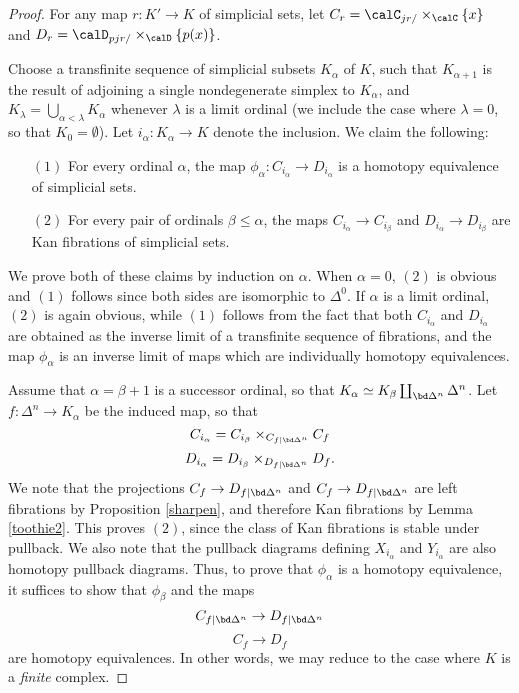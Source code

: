 \begin{proof}
For any map $r: K' \rightarrow K$ of simplicial sets, let $C_{r} = \calC_{j r/} \times_{\calC} \{x\}$ and $D_{r} = \calD_{pjr/} \times_{\calD} \{p(x)\}$. 

Choose a transfinite sequence of simplicial subsets $K_{\alpha}$ of $K$, such that $K_{\alpha+1}$ is the result of adjoining a single nondegenerate simplex to $K_{\alpha}$, and $K_{\lambda} = \bigcup_{\alpha<\lambda} K_{\alpha}$ whenever $\lambda$ is a limit ordinal (we include the case where $\lambda = 0$, so that $K_0 = \emptyset$). Let $i_{\alpha}: K_{\alpha} \rightarrow K$ denote the inclusion. We claim the following:
\begin{itemize}
\item[$(1)$] For every ordinal $\alpha$, the map $\phi_{\alpha}: C_{i_{\alpha}} \rightarrow D_{i_{\alpha}}$ is a homotopy equivalence of simplicial sets.
\item[$(2)$] For every pair of ordinals $\beta \leq \alpha$, the maps $C_{i_{\alpha}} \rightarrow C_{i_{\beta}}$ and $D_{i_{\alpha}} \rightarrow D_{i_{\beta}}$ are Kan fibrations of simplicial sets.
\end{itemize}

We prove both of these claims by induction on $\alpha$. When $\alpha = 0$, $(2)$ is obvious and $(1)$ follows since both sides are isomorphic to $\Delta^0$. If $\alpha$ is a limit ordinal, $(2)$ is again obvious, while $(1)$ follows from the fact that both $C_{i_{\alpha}}$ and $D_{i_{\alpha}}$
are obtained as the inverse limit of a transfinite sequence of fibrations, and the map $\phi_{\alpha}$ is an inverse limit of maps which are individually homotopy equivalences.

Assume that $\alpha=\beta+1$ is a successor ordinal, so that $K_{\alpha} \simeq K_{\beta} \coprod_{ \bd \Delta^n } \Delta^n$. Let $f: \Delta^n \rightarrow K_{\alpha}$ be the induced map, so that
$$ C_{i_\alpha} = C_{i_{\beta}} \times_{ C_{ f | \bd \Delta^n } } C_{f} $$
$$ D_{i_\alpha} = D_{i_{\beta}} \times_{ D_{ f| \bd \Delta^n }} D_{f}.$$
We note that the projections $C_{f} \rightarrow D_{f | \bd \Delta^n }$ and $C_{f} \rightarrow D_{f| \bd \Delta^n}$ are left fibrations by Proposition \ref{sharpen}, and therefore Kan fibrations by Lemma \ref{toothie2}. This proves $(2)$, since the class of Kan fibrations is stable under pullback.
We also note that the pullback diagrams defining $X_{i_{\alpha}}$ and $Y_{i_{\alpha}}$ are also  homotopy pullback diagrams. Thus, to prove that $\phi_{\alpha}$ is a homotopy equivalence, it suffices to show that $\phi_{\beta}$ and the maps
$$ C_{f| \bd \Delta^n } \rightarrow D_{ f| \bd \Delta^n }$$
$$ C_{f} \rightarrow D_{f}$$
are homotopy equivalences. In other words, we may reduce to the case where $K$ is a {\em finite} complex. 


\end{proof}
